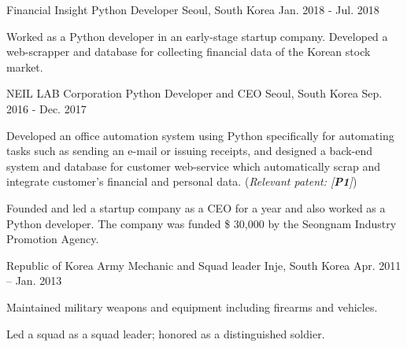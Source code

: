 


\begin{cventries}


\cventry
{Financial Insight} %
{Python Developer} %
{Seoul, South Korea} %
{Jan. 2018 - Jul. 2018} %
{ %
\begin{cvitems}
\item {Worked as a Python developer in an early-stage startup company. Developed a web-scrapper and database for collecting financial data of the Korean stock market.}
\end{cvitems}
}

\cventry
{NEIL LAB Corporation} %
{Python Developer and CEO} %
{Seoul, South Korea} %
{Sep. 2016 - Dec. 2017} %
{ %
\begin{cvitems}
\item {Developed an office automation system using Python specifically for automating tasks such as sending an e-mail or issuing receipts, and designed a back-end system and database for customer web-service which automatically scrap and integrate customer's financial and personal data. (\textit{Relevant patent: [\textbf{P1}]})}
\item {Founded and led a startup company as a CEO for a year and also worked as a Python developer. The company was funded \$ 30,000 by the Seongnam Industry Promotion Agency.}
\end{cvitems}
}

\cventry
{Republic of Korea Army} %
{Mechanic and Squad leader} %
{Inje, South Korea} %
{Apr. 2011 – Jan. 2013} %
{ %
\begin{cvitems}
\item {Maintained military weapons and equipment including firearms and vehicles.}
\item {Led a squad as a squad leader; honored as a distinguished soldier.}
\end{cvitems}
}


\end{cventries}